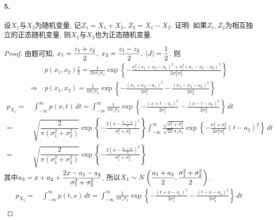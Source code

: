\documentclass[12pt, a4paper, oneside]{ctexart}
\begin{document}
\paragraph{5.}设$X_1$与$X_2$为随机变量, 记$Z_1 = X_1+X_2,\ Z_2 = X_1-X_2$. 证明: 如果$Z_1,Z_2$为相互独立的正态随机变量, 则$X_1$与$X_2$也为正态随机变量.
\begin{proof}
    由题可知, $\displaystyle x_1 = \frac{z_1+z_2}{2},\ x_2 = \frac{z_1-z_2}{2},\ |J| = \frac{1}{2}$, 则
    \begin{equation*}
        \begin{aligned}
            &\ p(x_1,x_2)\frac{1}{2} = \frac{1}{2\pi\sigma_1\sigma_2}\exp\left\{-\frac{\sigma_2^2(x_1+x_2-a_1)^2+\sigma_1^2(x_1-x_2-a_2)^2}{2\sigma_1^2\sigma_2^2}\right\}\\
            \Rightarrow&\ p(x_1,x_2) = \frac{1}{\pi\sigma_1\sigma_2}\exp\left\{-\frac{(x_1+x_2-a_1)^2}{2\sigma_1^2}-\frac{(x_1-x_2-a_2)^2}{2\sigma_2^2}\right\}
        \end{aligned}
    \end{equation*}
    \begin{equation*}
        \begin{aligned}
            p_{X_1} =&\ \int_{-\infty}^{\infty}p(x, t)\,dt = \int_{-\infty}^{\infty}\frac{1}{\pi \sigma_1\sigma_2}\exp\left\{-\frac{(x+t-a_1)^2}{2\sigma_1^2}-\frac{(x-t-a_2)^2}{2\sigma_2^2}\right\}\,dt\\
            =&\ \sqrt{\dfrac{2}{\pi(\sigma_1^2+\sigma_2^2)}}\exp\left\{-\frac{2\left(x-\frac{a_1+a_2}{2}\right)^2}{\sigma_1^2+\sigma_2^2}\right\}\int_{-\infty}^{\infty}\frac{\sqrt{\sigma_1^2+\sigma_2^2}}{\sqrt{2\pi}\sigma_1\sigma_2}\exp\left\{-\frac{\sigma_1^2+\sigma_2^2}{2\sigma_1^2\sigma_2^2}\left(t-a_3\right)^2\right\}\,dt\\
            =&\ \sqrt{\dfrac{2}{\pi(\sigma_1^2+\sigma_2^2)}}\exp\left\{-\frac{2\left(x-\frac{a_1+a_2}{2}\right)^2}{\sigma_1^2+\sigma_2^2}\right\}
        \end{aligned}
    \end{equation*}
    其中$\displaystyle a_3 = x+a_2+\frac{2x-a_1-a_2}{\sigma_1^2+\sigma_2^2}$, 所以$\displaystyle X_1\sim N\left(\frac{a_1+a_2}{2},\frac{\sigma_1^2+\sigma_2^2}{2}\right)$.
    \begin{equation*}
        \begin{aligned}
            p_{X_2} =&\ \int_{-\infty}^{\infty}p(t, x)\,dt = \int_{-\infty}^{\infty}\frac{1}{\pi \sigma_1\sigma_2}\exp\left\{-\frac{(t+x-a_1)^2}{2\sigma_1^2}-\frac{(t-x-a_2)^2}{2\sigma_2^2}\right\}\,dt\\

\end{aligned}
\end{equation*}
\end{proof}
\end{document}
